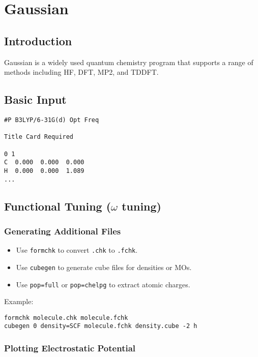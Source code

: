 \chapter{Gaussian}

\section{Introduction}

Gaussian is a widely used quantum chemistry program that supports a range of methods including HF, DFT, MP2, and TDDFT.

\section{Basic Input}

\begin{verbatim}
#P B3LYP/6-31G(d) Opt Freq

Title Card Required

0 1
C  0.000  0.000  0.000
H  0.000  0.000  1.089
...
\end{verbatim}

\section{Functional Tuning ($\omega$ tuning)}

\subsection*{Generating Additional Files}

\begin{itemize}
  \item Use \texttt{formchk} to convert \texttt{.chk} to \texttt{.fchk}.
  \item Use \texttt{cubegen} to generate cube files for densities or MOs.
  \item Use \texttt{pop=full} or \texttt{pop=chelpg} to extract atomic charges.
\end{itemize}

Example:

\begin{verbatim}
formchk molecule.chk molecule.fchk
cubegen 0 density=SCF molecule.fchk density.cube -2 h
\end{verbatim}

\subsection*{Plotting Electrostatic Potential}

